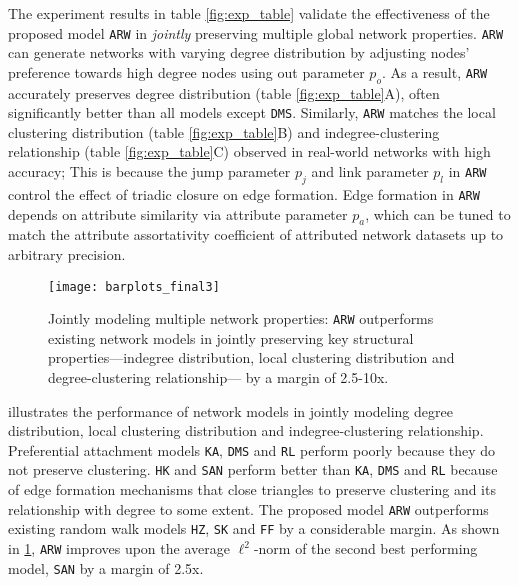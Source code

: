 The experiment results in table \ref{fig:exp_table} validate the effectiveness
of the proposed model \texttt{ARW} in \textit{jointly} preserving multiple
global network properties. \texttt{ARW} can generate networks with varying
degree distribution by adjusting nodes' preference towards high degree nodes
using out parameter $p_o$. As a result, \texttt{ARW} accurately preserves
degree distribution (table \ref{fig:exp_table}A), often significantly better
than all models except \texttt{DMS}. Similarly, \texttt{ARW} matches the local clustering
distribution  (table \ref{fig:exp_table}B) and indegree-clustering relationship
(table \ref{fig:exp_table}C) observed in real-world networks with high accuracy;
This is because the jump parameter $p_j$ and link parameter $p_l$ in \texttt{ARW}
control the effect of triadic closure on edge formation. Edge formation in \texttt{ARW}
depends on attribute similarity via attribute parameter $p_a$, which can be tuned to
match the attribute assortativity coefficient of attributed network datasets up to
arbitrary precision.
\begin{figure}
    \centering
    \texttt{[image: barplots\_final3]}
    \caption{Jointly modeling multiple network properties: \texttt{ARW} outperforms
    existing network models in jointly preserving key structural properties---indegree
    distribution, local clustering distribution and degree-clustering relationship---
    by a margin of 2.5-10x.
     }
     \label{fig:barplot}
\end{figure}

 illustrates the performance of network models in jointly
modeling degree distribution, local clustering distribution and indegree-clustering
relationship. Preferential attachment models \texttt{KA}, \texttt{DMS} and
\texttt{RL} perform poorly because they do not preserve clustering. \texttt{HK}
and \texttt{SAN} perform better than \texttt{KA}, \texttt{DMS} and
\texttt{RL} because of edge formation mechanisms that close triangles
to preserve clustering and its relationship with degree to some extent. The proposed
model \texttt{ARW} outperforms existing random walk models \texttt{HZ}, \texttt{SK}
and \texttt{FF} by a considerable margin.  As shown in \cref{fig:barplot},
\texttt{ARW} improves upon the average $\ell^2$-norm of the second best performing model,
\texttt{SAN} by a margin of 2.5x.


